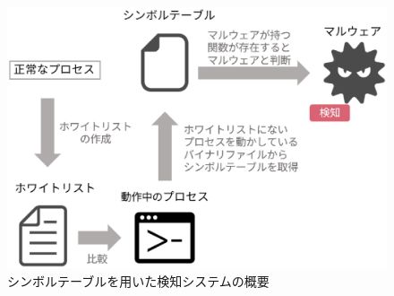  \begin{figure}[h]
 \centering
    \includegraphics[width=120mm]{figures/system.eps}
    \caption{シンボルテーブルを用いた検知システムの概要}
    \label{fig:symbol}
 \end{figure}
 
\newpage


